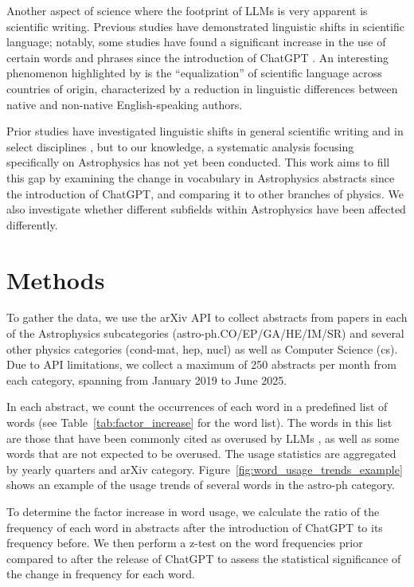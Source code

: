 \documentclass[twocolumn]{aastex701}
\begin{document}
Another aspect of science where the footprint of LLMs is very apparent is scientific writing.
Previous studies have demonstrated linguistic shifts in scientific language;
notably, some studies have found a significant increase in the use of certain words and phrases since the introduction of ChatGPT \citep{Kobak2025,Bao2025,Juzek2024}.
An interesting phenomenon highlighted by \citet{Lin2025} is the ``equalization'' of scientific language across countries of origin, characterized by a reduction in linguistic differences between native and non-native English-speaking authors.

Prior studies have investigated linguistic shifts in general scientific writing and in select disciplines \citep{Xu2024,Kobak2025,Bao2025}, but to our knowledge, a systematic analysis focusing specifically on Astrophysics has not yet been conducted.
This work aims to fill this gap by examining the change in vocabulary in Astrophysics abstracts since the introduction of ChatGPT, and comparing it to other branches of physics.
We also investigate whether different subfields within Astrophysics have been affected differently.


\section{Methods}

To gather the data, we use the arXiv API to collect abstracts from papers in each of the Astrophysics subcategories (astro-ph.CO/EP/GA/HE/IM/SR) and several other physics categories (cond-mat, hep, nucl) as well as Computer Science (cs).
Due to API limitations, we collect a maximum of 250 abstracts per month from each category, spanning from January 2019 to June 2025.

In each abstract, we count the occurrences of each word in a predefined list of words (see Table~\ref{tab:factor_increase} for the word list).
The words in this list are those that have been commonly cited as overused by LLMs \citep{Bao2025,Kobak2025}, as well as some words that are not expected to be overused.
The usage statistics are aggregated by yearly quarters and arXiv category.
Figure~\ref{fig:word_usage_trends_example} shows an example of the usage trends of several words in the astro-ph category.

To determine the factor increase in word usage, we calculate the ratio of the frequency of each word in abstracts after the introduction of ChatGPT to its frequency before.
We then perform a z-test on the word frequencies prior compared to after the release of ChatGPT to assess the statistical significance of the change in frequency for each word.
\end{document}
